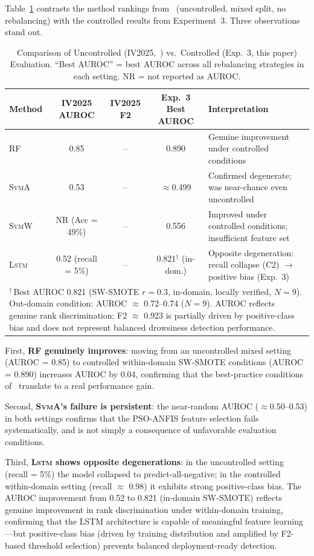 \documentclass[lettersize,journal]{IEEEtran}
\newcommand{\Impl}[1]{\textsc{#1}}
\begin{document}
Table~\ref{tab:iv_comparison} contrasts the method rankings from~\cite{nakagama2025iv} (uncontrolled, mixed split, no rebalancing) with the controlled results from Experiment~3.
Three observations stand out.

\begin{table}[!t]
\caption{Comparison of Uncontrolled (IV2025,~\cite{nakagama2025iv}) vs.\ Controlled (Exp.~3, this paper) Evaluation. ``Best AUROC'' = best AUROC across all rebalancing strategies in each setting. NR = not reported as AUROC.\label{tab:iv_comparison}}
\centering
\small
\begin{tabular}{|l|c|c|c|l|}
\hline
Method & IV2025 AUROC & IV2025 F2 & Exp.~3 Best AUROC & Interpretation \\
\hline
RF & 0.85 & -- & 0.890 & Genuine improvement under controlled conditions \\
\hline
\Impl{SvmA} & 0.53 & -- & $\approx$0.499 & Confirmed degenerate; was near-chance even uncontrolled \\
\hline
\Impl{SvmW} & NR (Acc = 49\%) & -- & 0.556 & Improved under controlled conditions; insufficient feature set \\
\hline
\Impl{Lstm} & 0.52 (recall = 5\%) & -- & 0.821$^{\dag}$ (in-dom.) & Opposite degeneration: recall collapse (C2) $\to$ positive bias (Exp.~3) \\
\hline
\multicolumn{5}{|p{0.97\textwidth}|}{\footnotesize $^{\dag}$\,Best AUROC 0.821 (SW-SMOTE $r{=}0.3$, in-domain, locally verified, $N{=}9$). Out-domain condition: AUROC $\approx$ 0.72--0.74 ($N{=}9$). AUROC reflects genuine rank discrimination; F2 $\approx$ 0.923 is partially driven by positive-class bias and does not represent balanced drowsiness detection performance.} \\
\hline
\end{tabular}
\end{table}

First, \textbf{RF genuinely improves}: moving from an uncontrolled mixed setting (AUROC = 0.85) to controlled within-domain SW-SMOTE conditions (AUROC = 0.890) increases AUROC by 0.04, confirming that the best-practice conditions of~\cite{nakagama2026tiv} translate to a real performance gain.

Second, \textbf{\Impl{SvmA}'s failure is persistent}: the near-random AUROC ($\approx$0.50--0.53) in both settings confirms that the PSO-ANFIS feature selection fails systematically, and is not simply a consequence of unfavorable evaluation conditions.

Third, \textbf{\Impl{Lstm} shows opposite degenerations}: in the uncontrolled setting (recall = 5\%) the model collapsed to predict-all-negative; in the controlled within-domain setting (recall $\approx$ 0.98) it exhibits strong positive-class bias.
The AUROC improvement from 0.52 to 0.821 (in-domain SW-SMOTE) reflects genuine improvement in rank discrimination under within-domain training, confirming that the LSTM architecture is capable of meaningful feature learning---but positive-class bias (driven by training distribution and amplified by F2-based threshold selection) prevents balanced deployment-ready detection.
\end{document}
